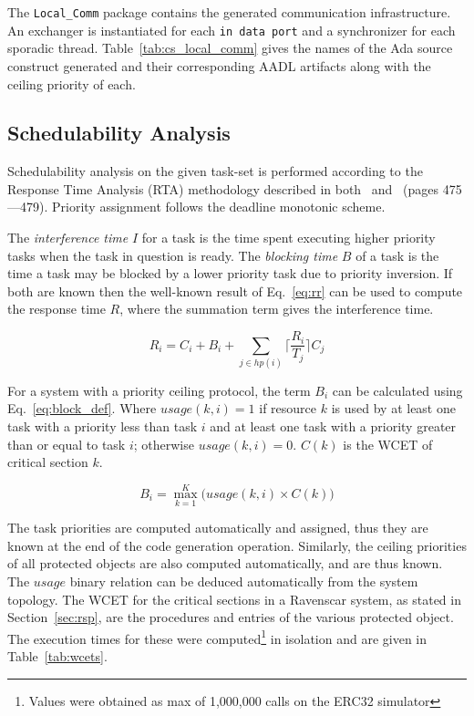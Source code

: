 The \texttt{Local\_Comm} package contains the generated communication
infrastructure. An exchanger is instantiated for each \texttt{in data
  port} and a synchronizer for each sporadic
thread. Table~\ref{tab:cs_local_comm} gives the names of the Ada source
construct generated and their corresponding AADL artifacts along with
the ceiling priority of each.

\subsection{Schedulability Analysis}
Schedulability analysis on the given task-set is performed according
to the Response Time Analysis (RTA) methodology described in
both~\cite{burns@adalett04} and~\cite{burns-rtspl} (pages
475---479). Priority assignment follows the deadline monotonic scheme.

The \emph{interference time} $I$ for a task is the time spent
executing higher priority tasks when the task in question is
ready. The \emph{blocking time} $B$ of a task is the time a task may
be blocked by a lower priority task due to priority inversion. If both
are known then the well-known result of Eq.~\ref{eq:rr} can
be used to compute the response time $R$, where the summation term
gives the interference time.

\begin{equation}
\label{eq:rr}
R_i=C_i + B_i + \sum_{j\in hp(i)}\Bigg\lceil \frac{R_i}{T_j}\Bigg\rceil C_j
\end{equation}

For a system with a priority ceiling protocol, the term $B_i$ can be
calculated using Eq.~\ref{eq:block_def}. Where $usage(k,i)=1$ if
resource $k$ is used by at least one task with a priority less than
task $i$ and at least one task with a priority greater than or equal
to task $i$; otherwise $usage(k,i)=0$. $C(k)$ is the WCET of critical
section $k$.

\begin{equation}
\label{eq:block_def}
B_i = \max_{k=1}^{K} \Big(usage(k,i)\times C(k)\Big)
\end{equation}

The task priorities are computed automatically and assigned, thus they
are known at the end of the code generation operation. Similarly, the
ceiling priorities of all protected objects are also computed
automatically, and are thus known. The $usage$ binary relation can be
deduced automatically from the system topology. The WCET for the
critical sections in a Ravenscar system, as stated in
Section~\ref{sec:rsp}, are the procedures and entries of the various
protected object. The execution times for these were
computed\footnote{Values were obtained as max of 1,000,000 calls on
  the ERC32 simulator} in isolation and are given in
Table~\ref{tab:wcets}.

